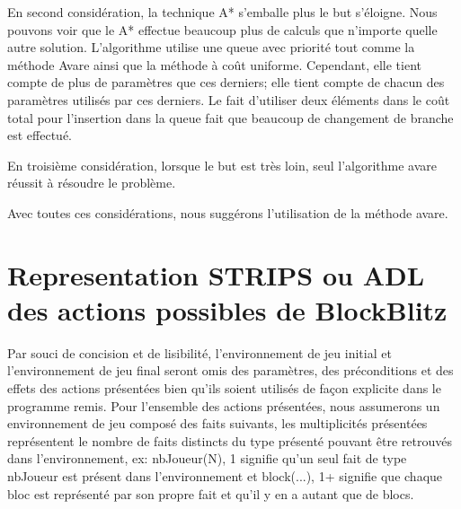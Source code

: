 \documentclass[12pt,english,frenchb,letterpaper]{article}
\begin{document}
En second considération, la technique A* s'emballe plus le but s'éloigne. Nous pouvons voir que le A* effectue beaucoup plus de calculs que n'importe quelle autre solution. L'algorithme utilise une queue avec priorité tout comme la méthode Avare ainsi que la méthode à coût uniforme. Cependant, elle tient compte de plus de paramètres que ces derniers; elle tient compte de chacun des paramètres utilisés par ces derniers. Le fait d'utiliser deux éléments dans le coût total pour l'insertion dans la queue fait que beaucoup de changement de branche est effectué.

En troisième considération, lorsque le but est très loin, seul l'algorithme avare réussit à résoudre le problème.

Avec toutes ces considérations, nous suggérons l'utilisation de la méthode avare.



\section{Representation STRIPS ou ADL des actions possibles de BlockBlitz}
Par souci de concision et de lisibilité, l'environnement de jeu initial et l'environnement de jeu final seront omis des paramètres, des préconditions et des effets des actions présentées bien qu'ils soient utilisés de fa\c con explicite dans le programme remis.  Pour l'ensemble des actions présentées, nous assumerons un environnement de jeu composé des faits suivants, les multiplicités présentées représentent le nombre de faits distincts du type présenté pouvant être retrouvés dans l'environnement, ex: nbJoueur(N), 1 signifie qu'un seul fait de type nbJoueur est présent dans l'environnement et block(...), 1+ signifie que chaque bloc est représenté par son propre fait et qu'il y en a autant que de blocs.
\end{document}
